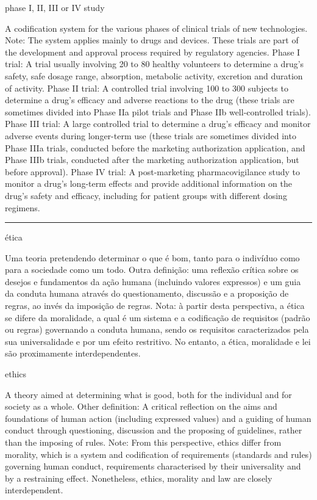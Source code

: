 \documentclass[
  openany]{book}
\begin{document}
phase I, II, III or IV study

A codification system for the various phases of clinical trials of new technologies. Note: The system applies mainly to drugs and devices. These trials are part of the development and approval process required by regulatory agencies. Phase I trial: A trial usually involving 20 to 80 healthy volunteers to determine a drug's safety, safe dosage range, absorption, metabolic activity, excretion and duration of activity. Phase II trial:
A controlled trial involving 100 to 300 subjects to determine a drug's efficacy and adverse reactions to the drug (these trials are sometimes divided into Phase IIa pilot trials and Phase IIb well-controlled trials). Phase III trial:
A large controlled trial to determine a drug's efficacy and monitor adverse events during longer-term use (these trials are sometimes divided into Phase IIIa trials, conducted before the marketing authorization application, and Phase IIIb trials, conducted after the marketing authorization application, but before approval). Phase IV trial:
A post-marketing pharmacovigilance study to monitor a drug's long-term effects and provide additional information on the drug's safety and efficacy, including for patient groups with different dosing regimens.

\begin{center}\rule{0.5\linewidth}{0.5pt}\end{center}

ética

Uma teoria pretendendo determinar o que é bom, tanto para o indivíduo como para a sociedade como um todo. Outra definição: uma reflexão crítica sobre os desejos e fundamentos da ação humana (incluindo valores expressos) e um guia da conduta humana através do questionamento, discussão e a proposição de regras, ao invés da imposição de regras. Nota: à partir desta perspectiva, a ética se difere da moralidade, a qual é um sistema e a codificação de requisitos (padrão ou regras) governando a conduta humana, sendo os requisitos caracterizados pela sua universalidade e por um efeito restritivo. No entanto, a ética, moralidade e lei são proximamente interdependentes.

ethics

A theory aimed at determining what is good, both for the individual and for society as a whole. Other definition: A critical reflection on the aims and foundations of human action (including expressed values) and a guiding of human conduct through questioning, discussion and the proposing of guidelines, rather than the imposing of rules. Note: From this perspective, ethics differ from morality, which is a system and codification of requirements (standards and rules) governing human conduct, requirements characterised by their universality and by a restraining effect. Nonetheless, ethics, morality and law are closely interdependent.
\end{document}

